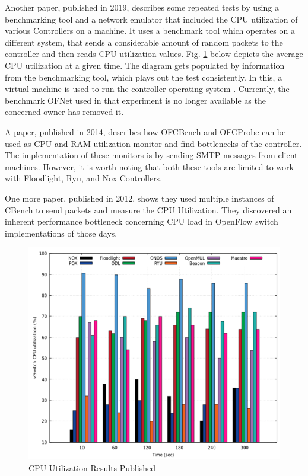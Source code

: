     Another paper, published in 2019, describes some repeated tests by using a benchmarking tool and a network emulator that included the CPU utilization of various Controllers on a machine. It uses a benchmark tool which operates on a different system, that sends a considerable amount of random packets to the controller and then reads CPU utilization values. Fig. \ref{figzhu2019sdn} below depicts the average CPU utilization at a given time. The diagram gets populated by information from the benchmarking tool, which plays out the test consistently. In this, a virtual machine is used to run the controller operating system \cite{zhu2019sdn}. Currently, the benchmark OFNet used in that experiment is no longer available as the concerned owner has removed it.
    
    A paper, published in 2014, describes how OFCBench and OFCProbe can be used as CPU and RAM utilization monitor and find bottlenecks of the controller. The implementation of these monitors is by sending SMTP messages from client machines. However, it is worth noting that both these tools are limited to work with Floodlight, Ryu, and Nox Controllers. \cite{ofcprobe}
    
    One more paper, published in 2012, shows they used multiple instances of CBench to send packets and measure the CPU Utilization. They discovered an inherent performance bottleneck concerning CPU load in OpenFlow switch implementations of those days. \cite{flexible}
    
\begin{figure}[!hbt]
    \centering
        \includegraphics[width=\textwidth,keepaspectratio]{images/zhucpu.png}
       \caption{CPU Utilization Results Published \cite{zhu2019sdn}}
        \label{figzhu2019sdn}
\end{figure}

